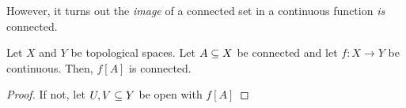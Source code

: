 However, it turns out the \textit{image} of a connected set in a continuous function \textit{is} connected.

\begin{boxlemma}
    Let $X$ and $Y$ be topological spaces. Let $A \subseteq X$ be connected and let $f : X \to Y$ be continuous. Then, $f[A]$ is connected.
\end{boxlemma}
\begin{proof}
    If not, let $U, V \subseteq Y$ be open with $f[A]$ \sorry
\end{proof}

